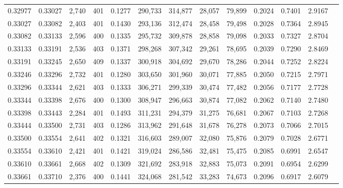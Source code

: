 \begin{tabular}{rrrrrrrrrrrrr}
0.32977 & 0.33027 &  2,740 & 401 &                                     0.1277 & 290,733 & 314,877 &  28,057 &  79,899 & 0.2024 & 0.7401 & 2.9167 \\
0.33027 & 0.33082 &  2,403 & 401 &                                     0.1430 & 293,136 & 312,474 &  28,458 &  79,498 & 0.2028 & 0.7364 & 2.8945 \\
0.33082 & 0.33133 &  2,596 & 400 &                                     0.1335 & 295,732 & 309,878 &  28,858 &  79,098 & 0.2033 & 0.7327 & 2.8704 \\
0.33133 & 0.33191 &  2,536 & 403 &                                     0.1371 & 298,268 & 307,342 &  29,261 &  78,695 & 0.2039 & 0.7290 & 2.8469 \\
0.33191 & 0.33245 &  2,650 & 409 &                                     0.1337 & 300,918 & 304,692 &  29,670 &  78,286 & 0.2044 & 0.7252 & 2.8224 \\
0.33246 & 0.33296 &  2,732 & 401 &                                     0.1280 & 303,650 & 301,960 &  30,071 &  77,885 & 0.2050 & 0.7215 & 2.7971 \\
0.33296 & 0.33344 &  2,621 & 403 &                                     0.1333 & 306,271 & 299,339 &  30,474 &  77,482 & 0.2056 & 0.7177 & 2.7728 \\
0.33344 & 0.33398 &  2,676 & 400 &                                     0.1300 & 308,947 & 296,663 &  30,874 &  77,082 & 0.2062 & 0.7140 & 2.7480 \\
0.33398 & 0.33443 &  2,284 & 401 &                                     0.1493 & 311,231 & 294,379 &  31,275 &  76,681 & 0.2067 & 0.7103 & 2.7268 \\
0.33444 & 0.33500 &  2,731 & 403 &                                     0.1286 & 313,962 & 291,648 &  31,678 &  76,278 & 0.2073 & 0.7066 & 2.7015 \\
0.33500 & 0.33554 &  2,641 & 402 &                                     0.1321 & 316,603 & 289,007 &  32,080 &  75,876 & 0.2079 & 0.7028 & 2.6771 \\
0.33554 & 0.33610 &  2,421 & 401 &                                     0.1421 & 319,024 & 286,586 &  32,481 &  75,475 & 0.2085 & 0.6991 & 2.6547 \\
0.33610 & 0.33661 &  2,668 & 402 &                                     0.1309 & 321,692 & 283,918 &  32,883 &  75,073 & 0.2091 & 0.6954 & 2.6299 \\
0.33661 & 0.33710 &  2,376 & 400 &                                     0.1441 & 324,068 & 281,542 &  33,283 &  74,673 & 0.2096 & 0.6917 & 2.6079 \\

\end{tabular}
